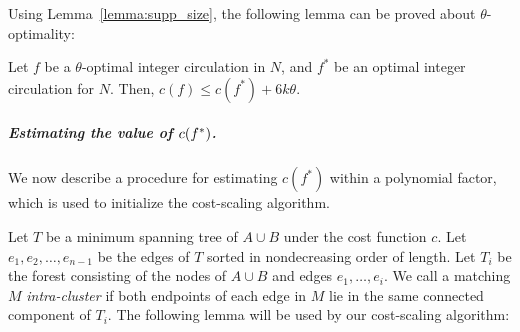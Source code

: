 \documentclass[a4paper,UKenglish]{socg-lipics-v2019}
\def\cost{c}
\theoremstyle{plain}
\numberwithin{figure}{section}
\renewcommand{\paragraph}{\subparagraph}
\def\EMPH#1{\textcolor{BrickRed}{{\emph{#1}}}}
\begin{document}
Using Lemma~\ref{lemma:supp_size}, the following lemma can be proved about
$\theta$-optimality:

\begin{lemma}
\label{lemma:goldberg_cost_add}
Let $f$ be a $\theta$-optimal integer circulation in $N$,
and $f^*$ be an optimal integer circulation for $N$.
Then, $\cost(f) \leq \cost(f^*) + 6k\theta$.
\end{lemma}

%
%

\paragraph{Estimating the value of \textbf{$\boldmath \cost(f^*)$}.}
We now describe a procedure for estimating $\cost(f^*)$ within a polynomial factor,
which is used to initialize the cost-scaling algorithm.

Let \EMPH{$T$} be a minimum spanning tree of $A \cup B$ under the cost function $c$.
Let $e_1, e_2, \ldots, e_{n-1}$ be the edges of $T$ sorted in nondecreasing order
of length.
Let \EMPH{$T_i$} be the forest consisting of the nodes of $A \cup B$ and
edges $e_1, \ldots, e_i$.
We call a matching $M$ \EMPH{intra-cluster} if both endpoints of
each edge in $M$ lie in the same connected component of $T_i$.
%
The following lemma will be used by our cost-scaling algorithm:
\end{document}

